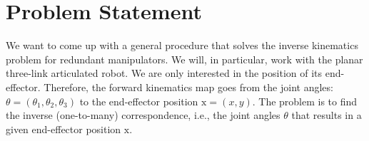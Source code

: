 \section{Problem Statement}
%
%
We want to come up with a general procedure that solves the inverse kinematics
problem for redundant manipulators. We will, in particular, work with the planar
three-link articulated robot. We are only interested in the position of its
end-effector. Therefore, the forward kinematics map goes from the joint angles:
$\theta = (\theta_1, \theta_2, \theta_3)$ to the end-effector position
$\mathrm{x} = (x,y)$. The problem is to find the inverse (one-to-many)
correspondence, i.e., the joint angles $\theta$ that results in a given
end-effector position $\mathrm{x}$.